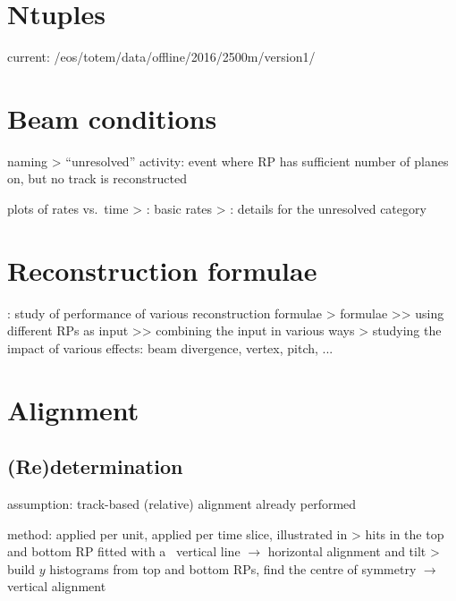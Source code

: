 \section{Ntuples}

\> current: /eos/totem/data/offline/2016/2500m/version1/



\section{Beam conditions}

\> naming
\>> ``unresolved'' activity: event where RP has sufficient number of planes on, but no track is reconstructed

\> plots of rates vs.~time
\>> : basic rates
\>> : details for the unresolved category



\section{Reconstruction formulae}

\>  : study of performance of various reconstruction formulae
\>> formulae
\>>> using different RPs as input
\>>> combining the input in various ways
\>> studying the impact of various effects: beam divergence, vertex, pitch, ...



\section{Alignment}

\subsection{(Re)determination}

\> assumption: track-based (relative) alignment already performed

\> method: applied per unit, applied per time slice, illustrated in 
\>> hits in the top and bottom RP fitted with a ~vertical line $\rightarrow$ horizontal alignment and tilt
\>> build $y$ histograms from top and bottom RPs, find the centre of symmetry $\rightarrow$ vertical alignment

